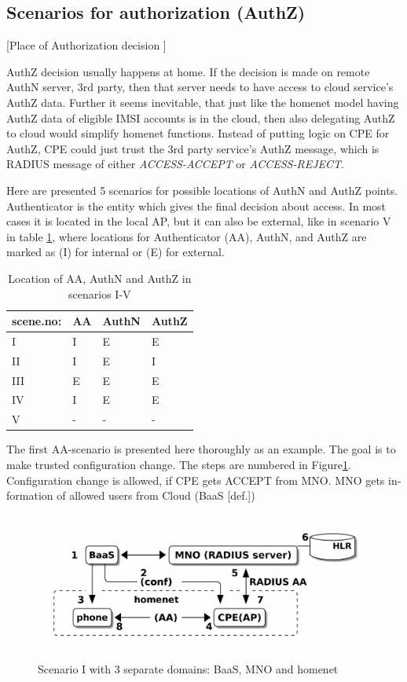 \documentclass[12pt,a4paper,english]{tutthesis}
\begin{document}
\begin{otherlanguage}{english}
\section{Scenarios for authorization (AuthZ)}
\label{sec-4-6}

[Place of Authorization decision  ]

AuthZ decision usually happens at home.
If the decision is made on remote AuthN server, 3rd party, 
then that server needs to have access to 
cloud service's AuthZ data. 
Further it seems inevitable, that just like the homenet model
having AuthZ data of eligible IMSI accounts is in the cloud, 
then also delegating AuthZ to cloud would simplify homenet
functions. Instead of putting logic on CPE for AuthZ, CPE
could just trust the 3rd party service's AuthZ message, which is 
RADIUS message of either \emph{ACCESS-ACCEPT} or \emph{ACCESS-REJECT}.


Here are presented 5 scenarios for possible locations of AuthN and 
AuthZ points. Authenticator is the entity which gives the final decision 
about access. In most cases it is located in the
local AP, but it can also be external, like in scenario V in 
table \ref{table-scenarios}, where locations for Authenticator (AA),
AuthN, and AuthZ are marked as (I) for internal or (E) for external.

\begin{table}[htb]
\caption{\label{table-scenarios}Location of AA, AuthN and AuthZ in scenarios I-V}
\centering
\begin{tabular}{llll}
scene.no: & AA & AuthN & AuthZ\\
\hline
I & I & E & E\\
II & I & E & I\\
III & E & E & E\\
IV & I & E & E\footnotemark\\
V & - & - & -\\
\end{tabular}
\end{table}


\label{scenario-i}
The first AA-scenario is presented here thoroughly as an example.
The goal is to make trusted configuration change. 
The steps are numbered in Figure\ref{fig:scenario-I}.
Configuration change is allowed, if CPE gets ACCEPT from MNO.  MNO gets
information of allowed users from Cloud (BaaS [def.])


\begin{figure}[htb]
\centering
\includegraphics[width=.9\linewidth]{scenI.png}
\caption{\label{fig:scenario-I}Scenario I with 3 separate domains: BaaS, MNO and homenet}
\end{figure}


\end{otherlanguage}
\end{document}
